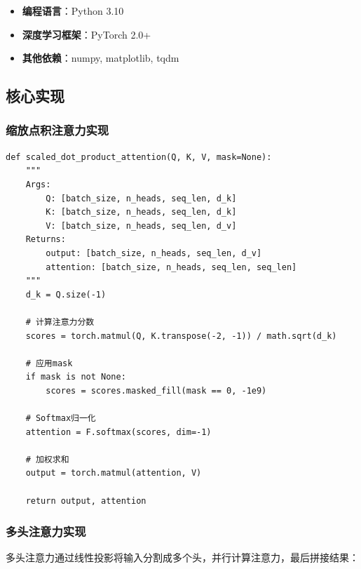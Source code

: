\documentclass[UTF8,12pt,a4paper]{ctexart}
\begin{document}
\begin{itemize}
    \item \textbf{编程语言}：Python 3.10
    \item \textbf{深度学习框架}：PyTorch 2.0+
    \item \textbf{其他依赖}：numpy, matplotlib, tqdm
\end{itemize}

\subsection{核心实现}

\subsubsection{缩放点积注意力实现}

\begin{lstlisting}[caption=缩放点积注意力的PyTorch实现, label=lst:attention]
def scaled_dot_product_attention(Q, K, V, mask=None):
    """
    Args:
        Q: [batch_size, n_heads, seq_len, d_k]
        K: [batch_size, n_heads, seq_len, d_k]
        V: [batch_size, n_heads, seq_len, d_v]
    Returns:
        output: [batch_size, n_heads, seq_len, d_v]
        attention: [batch_size, n_heads, seq_len, seq_len]
    """
    d_k = Q.size(-1)
    
    # 计算注意力分数
    scores = torch.matmul(Q, K.transpose(-2, -1)) / math.sqrt(d_k)
    
    # 应用mask
    if mask is not None:
        scores = scores.masked_fill(mask == 0, -1e9)
    
    # Softmax归一化
    attention = F.softmax(scores, dim=-1)
    
    # 加权求和
    output = torch.matmul(attention, V)
    
    return output, attention
\end{lstlisting}

\subsubsection{多头注意力实现}

多头注意力通过线性投影将输入分割成多个头，并行计算注意力，最后拼接结果：
\end{document}
